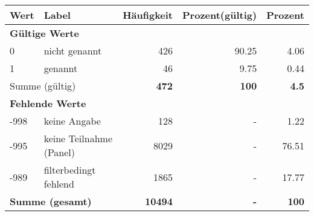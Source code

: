      \begin{longtable}{lXrrr}
     \toprule
     \textbf{Wert} & \textbf{Label} & \textbf{Häufigkeit} & \textbf{Prozent(gültig)} & \textbf{Prozent} \\
     \endhead
     \midrule
     \multicolumn{5}{l}{\textbf{Gültige Werte}}\\

     0 &
     \multicolumn{1}{X}{ nicht genannt   } &


       \num{426} &
       \num[round-mode=places,round-precision=2]{90.25} &
         \num[round-mode=places,round-precision=2]{4.06} \\

     1 &
     \multicolumn{1}{X}{ genannt   } &


       \num{46} &
       \num[round-mode=places,round-precision=2]{9.75} &
         \num[round-mode=places,round-precision=2]{0.44} \\
     \midrule
     \multicolumn{2}{l}{Summe (gültig)} &
       \textbf{\num{472}} &
     \textbf{\num{100}} &
       \textbf{\num[round-mode=places,round-precision=2]{4.5}} \\
     \multicolumn{5}{l}{\textbf{Fehlende Werte}}\\
       -998 &
       keine Angabe &
         \num{128} &
        - &
         \num[round-mode=places,round-precision=2]{1.22} \\
       -995 &
       keine Teilnahme (Panel) &
         \num{8029} &
        - &
         \num[round-mode=places,round-precision=2]{76.51} \\
       -989 &
       filterbedingt fehlend &
         \num{1865} &
        - &
         \num[round-mode=places,round-precision=2]{17.77} \\
     \midrule
     \multicolumn{2}{l}{\textbf{Summe (gesamt)}} &
          \textbf{\num{10494}} &
        \textbf{-} &
        \textbf{\num{100}} \\
     \bottomrule
     \end{longtable}
     
